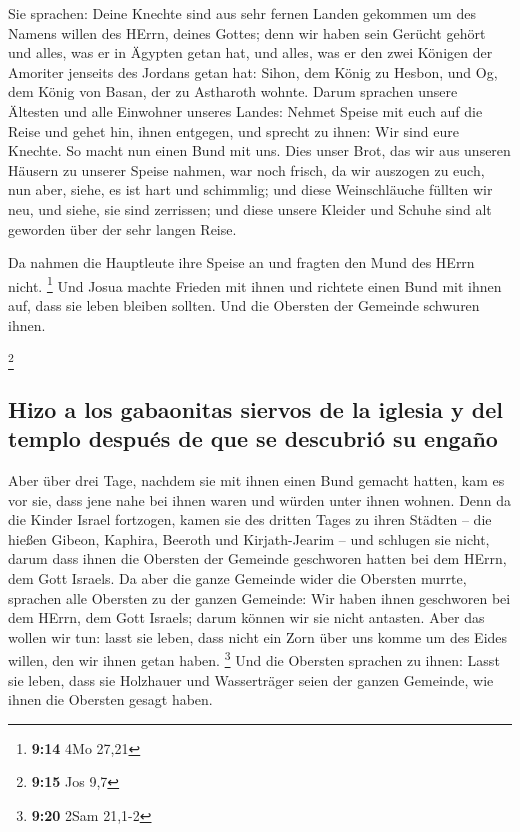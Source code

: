  Sie sprachen: Deine Knechte sind aus sehr fernen Landen
gekommen um des Namens willen des HErrn, deines Gottes; denn wir haben
sein Gerücht gehört und alles, was er in Ägypten getan hat,
 und alles, was er den zwei Königen der Amoriter jenseits
des Jordans getan hat: Sihon, dem König zu Hesbon, und Og, dem König von
Basan, der zu Astharoth wohnte.  Darum sprachen unsere
Ältesten und alle Einwohner unseres Landes: Nehmet Speise mit euch auf
die Reise und gehet hin, ihnen entgegen, und sprecht zu ihnen: Wir sind
eure Knechte. So macht nun einen Bund mit uns.  Dies
unser Brot, das wir aus unseren Häusern zu unserer Speise nahmen, war
noch frisch, da wir auszogen zu euch, nun aber, siehe, es ist hart und
schimmlig;  und diese Weinschläuche füllten wir neu, und
siehe, sie sind zerrissen; und diese unsere Kleider und Schuhe sind alt
geworden über der sehr langen Reise.

 Da nahmen die Hauptleute ihre Speise an und fragten den
Mund des HErrn nicht. \footnote{\textbf{9:14} 4Mo 27,21} 
Und Josua machte Frieden mit ihnen und richtete einen Bund mit ihnen
auf, dass sie leben bleiben sollten. Und die Obersten der Gemeinde
schwuren ihnen.

\footnote{\textbf{9:15} Jos 9,7}

\hypertarget{hizo-a-los-gabaonitas-siervos-de-la-iglesia-y-del-templo-despuuxe9s-de-que-se-descubriuxf3-su-engauxf1o}{%
\subsection{Hizo a los gabaonitas siervos de la iglesia y del templo
después de que se descubrió su
engaño}\label{hizo-a-los-gabaonitas-siervos-de-la-iglesia-y-del-templo-despuuxe9s-de-que-se-descubriuxf3-su-engauxf1o}}

 Aber über drei Tage, nachdem sie mit ihnen einen Bund
gemacht hatten, kam es vor sie, dass jene nahe bei ihnen waren und
würden unter ihnen wohnen.  Denn da die Kinder Israel
fortzogen, kamen sie des dritten Tages zu ihren Städten -- die hießen
Gibeon, Kaphira, Beeroth und Kirjath-Jearim --  und
schlugen sie nicht, darum dass ihnen die Obersten der Gemeinde
geschworen hatten bei dem HErrn, dem Gott Israels. Da aber die ganze
Gemeinde wider die Obersten murrte,  sprachen alle
Obersten zu der ganzen Gemeinde: Wir haben ihnen geschworen bei dem
HErrn, dem Gott Israels; darum können wir sie nicht antasten.
 Aber das wollen wir tun: lasst sie leben, dass nicht ein
Zorn über uns komme um des Eides willen, den wir ihnen getan haben.
\footnote{\textbf{9:20} 2Sam 21,1-2}  Und die Obersten
sprachen zu ihnen: Lasst sie leben, dass sie Holzhauer und Wasserträger
seien der ganzen Gemeinde, wie ihnen die Obersten gesagt haben.

